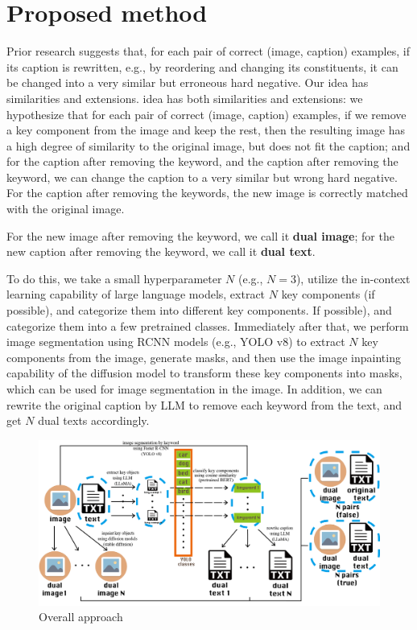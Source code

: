 \documentclass[11pt,letterpaper]{article}
\begin{document}
\section{Proposed method}
Prior research suggests that, for each pair of correct (image, caption) examples, if its caption is rewritten, e.g., by reordering and changing its constituents, it can be changed into a very similar but erroneous hard negative. Our idea has similarities and extensions. idea has both similarities and extensions: we hypothesize that for each pair of correct (image, caption) examples, if we remove a key component from the image and keep the rest, then the resulting image has a high degree of similarity to the original image, but does not fit the caption; and for the caption after removing the keyword, and the caption after removing the keyword, we can change the caption to a very similar but wrong hard negative. For the caption after removing the keywords, the new image is correctly matched with the original image.

For the new image after removing the keyword, we call it \textbf{dual image}; for the new caption after removing the keyword, we call it \textbf{dual text}. 

To do this, we take a small hyperparameter $N$ (e.g., $N=3$), utilize the in-context learning capability of large language models, extract $N$ key components (if possible), and categorize them into different key components. If possible), and categorize them into a few pretrained classes. Immediately after that, we perform image segmentation using RCNN models (e.g., YOLO v8) to extract $N$ key components from the image, generate masks, and then use the image inpainting capability of the diffusion model to transform these key components into masks, which can be used for image segmentation in the image. In addition, we can rewrite the original caption by LLM to remove each keyword from the text, and get $N$ dual texts accordingly.

\begin{figure}[H]
    \centering
    \includegraphics[width=1\textwidth]{midterm_report/assets/pipeline2.png}
    \caption{Overall approach}
\end{figure}
\end{document}
